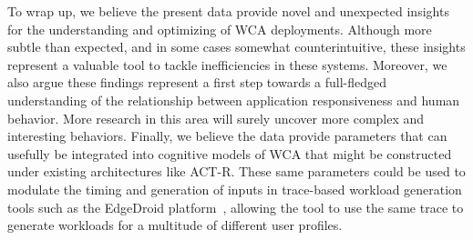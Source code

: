 To wrap up, we believe the present data provide novel and unexpected insights for the understanding and optimizing of
WCA deployments.
Although more subtle than expected, and in some cases somewhat counterintuitive, these insights represent a valuable
tool to tackle inefficiencies in these systems.
Moreover, we also argue these findings represent a first step towards a full-fledged understanding of the
relationship between application responsiveness and human behavior.
More research in this area will surely uncover more complex and interesting behaviors.
Finally, we believe the data provide parameters that can usefully be integrated into cognitive models of WCA that
might be constructed under existing architectures like ACT-R.
These same parameters could be used to modulate the timing and generation of inputs in trace-based workload
generation tools such as the EdgeDroid platform~\cite{olguin:2018,olguin:2019}, allowing the tool to use the same
trace to generate workloads for a multitude of different user profiles.


